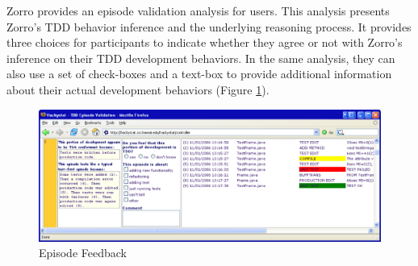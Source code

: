 Zorro provides an episode validation analysis for users. This analysis
presents Zorro's TDD behavior inference and the underlying reasoning
process. It provides three choices for participants to indicate whether
they agree or not with Zorro's inference on their TDD development
behaviors. In the same analysis, they can also use a set of check-boxes
and a text-box to provide additional information about their actual 
development behaviors (Figure \ref{fig:EpisodeFeedback}).
\begin{figure}[htbp]
  \centering
  \includegraphics[width=1.0\textwidth]{figs/EpisodeFeedback.eps}
  \caption{Episode Feedback}\label{fig:EpisodeFeedback}
\end{figure}

